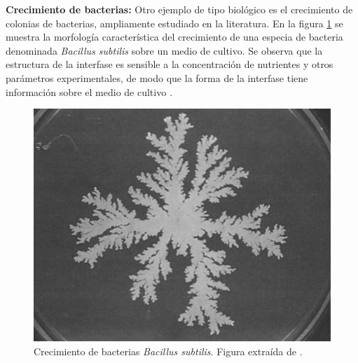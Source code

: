\textbf{Crecimiento de bacterias:} Otro ejemplo de tipo biológico es el crecimiento de colonias de bacterias, ampliamente estudiado en la literatura. En la figura 
\ref{fig:bacteria} se muestra la morfología característica del crecimiento de una especia de bacteria denominada \textit{Bacillus subtilis} sobre un medio de cultivo. 
Se observa que la estructura de la interfase es sensible a la concentración de nutrientes y otros parámetros experimentales, de modo que la forma de la interfase tiene 
información sobre el medio de cultivo \cite{matsushita1990diffusion,bhattacharjee2022chemotactic}.


\begin{figure}[ht]
    \centering
    \includegraphics[width=\imsizeS]{Bacteria.png}
    \caption[Crecimiento de bacterias \textit{Bacillus subtilis}.]{Crecimiento de bacterias \textit{Bacillus subtilis}. Figura extraída de \cite{matsushita1990diffusion}.}
    \label{fig:bacteria}
\end{figure}

